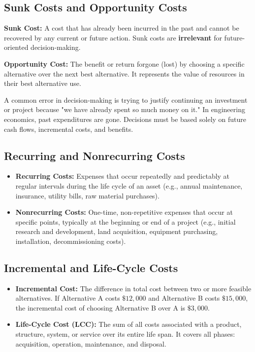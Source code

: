\documentclass[12pt,a4paper]{article}
\begin{document}
\subsection{Sunk Costs and Opportunity Costs}

\begin{tcolorbox}[defbox]
\textbf{Sunk Cost:} A cost that has already been incurred in the past and cannot be recovered by any current or future action. Sunk costs are \textbf{irrelevant} for future-oriented decision-making.
\par\vspace{3pt}
\textbf{Opportunity Cost:} The benefit or return forgone (lost) by choosing a specific alternative over the next best alternative. It represents the value of resources in their best alternative use.
\end{tcolorbox}

\begin{tcolorbox}[exambox, title={\textbf{Exam Tip: The Sunk Cost Fallacy}}]
A common error in decision-making is trying to justify continuing an investment or project because "we have already spent so much money on it." In engineering economics, past expenditures are gone. Decisions must be based solely on future cash flows, incremental costs, and benefits.
\end{tcolorbox}

\subsection{Recurring and Nonrecurring Costs}
\begin{itemize}[leftmargin=*, itemsep=3pt]
  \item \textbf{Recurring Costs:} Expenses that occur repeatedly and predictably at regular intervals during the life cycle of an asset (e.g., annual maintenance, insurance, utility bills, raw material purchases).
  \item \textbf{Nonrecurring Costs:} One-time, non-repetitive expenses that occur at specific points, typically at the beginning or end of a project (e.g., initial research and development, land acquisition, equipment purchasing, installation, decommissioning costs).
\end{itemize}

\subsection{Incremental and Life-Cycle Costs}
\begin{itemize}[leftmargin=*, itemsep=3pt]
  \item \textbf{Incremental Cost:} The difference in total cost between two or more feasible alternatives. If Alternative A costs $\$12,000$ and Alternative B costs $\$15,000$, the incremental cost of choosing Alternative B over A is $\$3,000$.
  \item \textbf{Life-Cycle Cost (LCC):} The sum of all costs associated with a product, structure, system, or service over its entire life span. It covers all phases: acquisition, operation, maintenance, and disposal.
\end{itemize}
\end{document}
